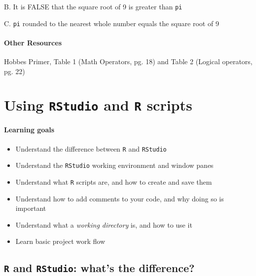\documentclass[
]{book}
\providecommand{\tightlist}{%
  \setlength{\itemsep}{0pt}\setlength{\parskip}{0pt}}
\begin{document}
B. It is FALSE that the square root of 9 is greater than \texttt{pi}

C. \texttt{pi} rounded to the nearest whole number equals the square root of 9

\hypertarget{other-resources}{%
\subsubsection*{Other Resources}\label{other-resources}}

Hobbes Primer, Table 1 (Math Operators, pg. 18) and Table 2 (Logical operators, pg. 22)

\hypertarget{using-rstudio-and-r-scripts}{%
\chapter{\texorpdfstring{Using \texttt{RStudio} and \texttt{R} scripts}{Using RStudio and R scripts}}\label{using-rstudio-and-r-scripts}}

\hypertarget{learning-goals-1}{%
\subsubsection*{Learning goals}\label{learning-goals-1}}

\begin{itemize}
\tightlist
\item
  Understand the difference between \texttt{R} and \texttt{RStudio}
\item
  Understand the \texttt{RStudio} working environment and window panes\\
\item
  Understand what \texttt{R} scripts are, and how to create and save them
\item
  Understand how to add comments to your code, and why doing so is important
\item
  Understand what a \emph{working directory} is, and how to use it
\item
  Learn basic project work flow
\end{itemize}

\hypertarget{r-and-rstudio-whats-the-difference}{%
\section*{\texorpdfstring{\texttt{R} and \texttt{RStudio}: what's the difference?}{R and RStudio: what's the difference?}}\label{r-and-rstudio-whats-the-difference}}
\end{document}

